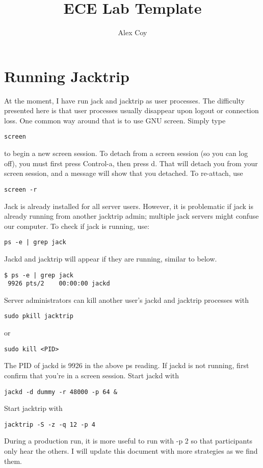 \documentclass[11pt, oneside]{article}
\title{ECE Lab Template}
\author{Alex Coy}
\numberwithin{equation}{subsection}
\begin{document}
\pagestyle{fancy}

\section{Running Jacktrip}
At the moment, I have run jack and jacktrip as user processes. The difficulty
presented here is that user processes usually disappear upon logout or
connection loss. One common way around that is to use GNU screen. Simply
type
\begin{verbatim}
screen
\end{verbatim}
to begin a new screen session. To detach from a screen session (so you can
log off), you must first press Control-a, then press d. That will detach
you from your screen session, and a message will show that you detached.
To re-attach, use 
\begin{verbatim}
screen -r
\end{verbatim}

Jack is already installed for all server users. However, it is problematic
if jack is already running from another jacktrip admin; multiple jack servers
might confuse our computer. To check if jack is running, use:
\begin{verbatim}
ps -e | grep jack
\end{verbatim}
Jackd and jacktrip will appear if they are running, similar to below.
\begin{verbatim}
$ ps -e | grep jack
 9926 pts/2    00:00:00 jackd
\end{verbatim}
Server administrators can kill another user's jackd and jacktrip processes with
\begin{verbatim}
sudo pkill jacktrip
\end{verbatim}
or
\begin{verbatim}
sudo kill <PID>
\end{verbatim}
The PID of jackd is 9926 in the above ps reading.
If jackd is not running, first confirm that you're in a screen session.
Start jackd with
\begin{verbatim}
jackd -d dummy -r 48000 -p 64 &
\end{verbatim}
Start jacktrip with
\begin{verbatim}
jacktrip -S -z -q 12 -p 4
\end{verbatim}
During a production run, it is more useful to run with -p 2 so that participants
only hear the others. I will update this document with more strategies as we
find them.
\end{document}
